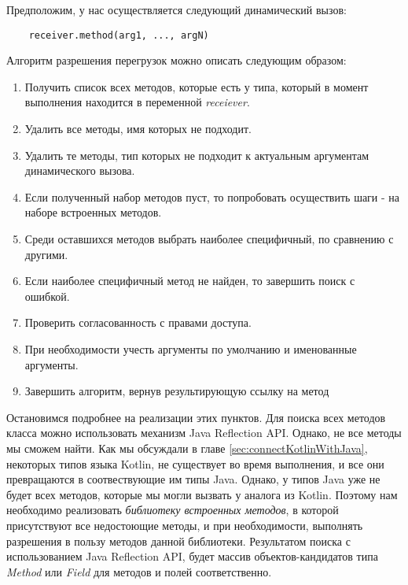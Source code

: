 Предположим, у нас осуществляется следующий динамический вызов:

\begin{verbatim}
    receiver.method(arg1, ..., argN)
\end{verbatim}

Алгоритм разрешения перегрузок можно описать следующим образом:

\begin{enumerate}
    \item Получить список всех методов, которые есть у типа, который в момент выполнения находится в переменной \textit{receiever}.
    \item Удалить все методы, имя которых не подходит.\label{itm:del1}
    \item Удалить те методы, тип которых не подходит к актуальным аргументам динамического вызова.\label{itm:del2}
    \item Если полученный набор методов пуст, то попробовать осуществить шаги \label{itm:del1}-\label{itm:del2} на наборе встроенных методов.
    \item Среди оставшихся методов выбрать наиболее специфичный, по сравнению с другими.
    \item Если наиболее специфичный метод не найден, то завершить поиск с ошибкой.
    \item Проверить согласованность с правами доступа.
    \item При необходимости учесть аргументы по умолчанию и именованные аргументы.
    \item Завершить алгоритм, вернув результирующую ссылку на метод
\end{enumerate}

Остановимся подробнее на реализации этих пунктов. Для поиска всех методов класса можно использовать механизм Java Reflection API. Однако, не все методы мы сможем найти. Как мы обсуждали в главе \ref{sec:connectKotlinWithJava}, некоторых типов языка Kotlin, не существует во время выполнения, и все они превращаются в соотвествующие им типы Java. Однако, у типов Java уже не будет всех методов, которые мы могли вызвать у аналога из Kotlin. Поэтому нам необходимо реализовать \textit{библиотеку встроенных методов}, в которой присутствуют все недостоющие методы, и при необходимости, выполнять разрешения в пользу методов данной библиотеки. Результатом поиска с использованием Java Reflection API, будет массив объектов-кандидатов типа \textit{Method} или 
\textit{Field} для методов и полей соответственно.

